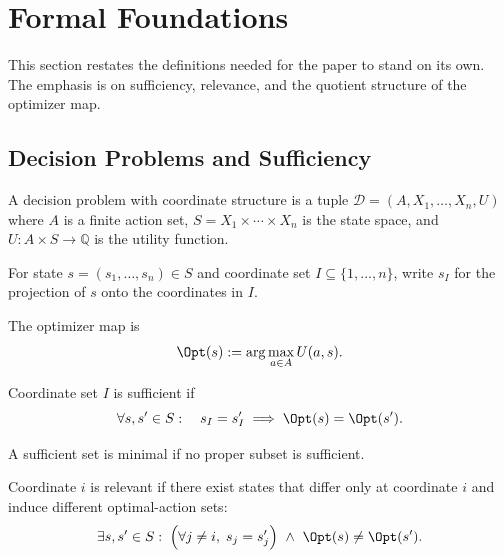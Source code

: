 \section{Formal Foundations}\label{sec:foundations}

This section restates the definitions needed for the paper to stand on its own. The emphasis is on sufficiency, relevance, and the quotient structure of the optimizer map.

\subsection{Decision Problems and Sufficiency}

\begin{definition}\label{def:decision-problem}
A decision problem with coordinate structure is a tuple $\mathcal{D}=(A,X_1,\ldots,X_n,U)$ where $A$ is a finite action set, $S=X_1 \times \cdots \times X_n$ is the state space, and $U : A \times S \to \mathbb{Q}$ is the utility function.
\end{definition}

\begin{definition}[Projection]\label{def:projection}
For state $s=(s_1,\ldots,s_n)\in S$ and coordinate set $I \subseteq \{1,\ldots,n\}$, write $s_I$ for the projection of $s$ onto the coordinates in $I$.
\end{definition}

\begin{definition}\label{def:optimizer}
The optimizer map is
\[
\Opt(s) := \arg\max_{a \in A} U(a,s).
\]
\end{definition}

\begin{definition}\label{def:sufficient}
Coordinate set $I$ is sufficient if
\[
\forall s,s' \in S:\quad s_I=s'_I \implies \Opt(s)=\Opt(s').
\]
\end{definition}

\begin{definition}\label{def:minimal-sufficient}
A sufficient set is minimal if no proper subset is sufficient.
\end{definition}

\begin{definition}\label{def:relevant}
Coordinate $i$ is relevant if there exist states that differ only at coordinate $i$ and induce different optimal-action sets:
\[
\exists s,s' \in S:\;
\Big(\forall j \neq i,\; s_j=s'_j\Big)
\ \wedge\
\Opt(s)\neq\Opt(s').
\]
\end{definition}

